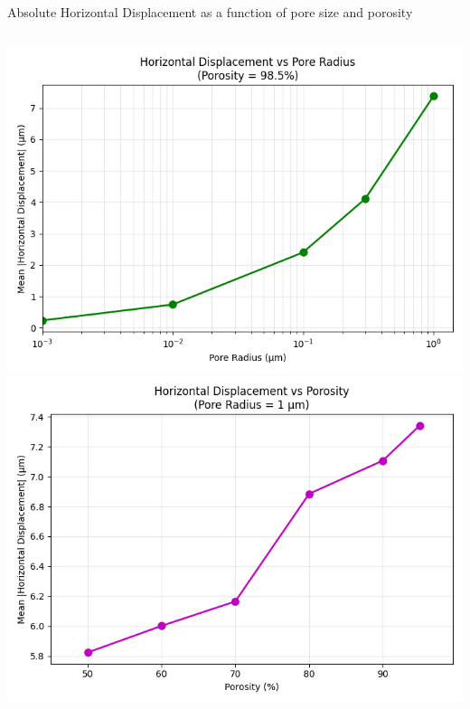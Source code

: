 \documentclass[aspectratio=169,xcolor=dvipsnames]{beamer}
\begin{document}
\begin{frame}{Absolute Horizontal Displacement as a function of pore size and porosity}
  \begin{columns}
    \includegraphics[width=\textwidth]{dxvsporeradiusnew.png}
    \includegraphics[width=\textwidth]{dxvsporositynew.png}
  \end{columns}
\end{frame}
\end{document}
